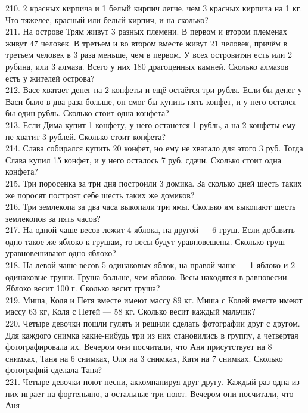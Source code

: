 210. 2 красных кирпича и 1 белый кирпич легче, чем 3 красных кирпича на 1 кг. Что тяжелее, красный или белый кирпич, и на сколько?\\
211. На острове Трям живут 3 разных племени. В первом и втором племенах живут 47 человек. В третьем и во втором вместе живут 21 человек, причём в третьем человек в 3 раза меньше, чем в первом. У всех островитян есть или 2 рубина, или 3 алмаза. Всего у них 180 драгоценных камней. Сколько алмазов есть у жителей острова?\\
212. Васе хватает денег на 2 конфеты и ещё остаётся три рубля. Если бы денег у Васи было в два раза больше, он смог бы купить пять конфет, и у него остался бы один рубль. Сколько стоит одна конфета?\\
213. Если Дима купит 1 конфету, у него останется 1 рубль, а на 2 конфеты ему не хватит 3 рублей. Сколько стоит конфета?\\
214. Слава собирался купить 20 конфет, но ему не хватало для этого 3 руб. Тогда Слава купил 15 конфет, и у него осталось 7 руб. сдачи. Сколько стоит одна конфета?\\
215. Три поросенка за три дня построили 3 домика. За сколько дней шесть таких же поросят построят себе шесть таких же домиков?\\
216. Три землекопа за два часа выкопали три ямы. Сколько ям выкопают шесть землекопов за пять часов?\\
217. На одной чаше весов лежит 4 яблока, на другой --- 6 груш. Если добавить одно такое же яблоко к грушам, то весы будут уравновешены. Сколько груш уравновешивают одно яблоко?\\
218. На левой чаше весов 5 одинаковых яблок, на правой чаше --- 1 яблоко и 2 одинаковые груши. Груша больше, чем яблоко. Весы находятся в равновесии. Яблоко весит 100 г. Сколько весит груша?\\
219. Миша, Коля и Петя вместе имеют массу 89 кг. Миша с Колей вместе имеют массу 63 кг, Коля с Петей --- 58 кг. Сколько весит каждый мальчик?\\
220. Четыре девочки пошли гулять и решили сделать фотографии друг с другом. Для каждого снимка какие-нибудь три из них становились в группу, а четвертая фотографировала их. Вечером они посчитали, что Аня присутствует на 8 снимках, Таня на 6 снимках, Оля на 3 снимках, Катя на 7 снимках. Сколько фотографий сделала Таня?\\
221. Четыре девочки поют песни, аккомпанируя друг другу. Каждый раз одна из них играет на фортепьяно, а остальные три поют. Вечером они посчитали, что Аня

